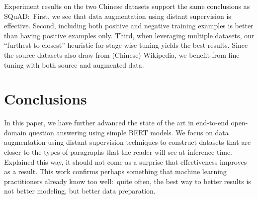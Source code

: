 \documentclass[11pt,a4paper]{article}
\begin{document}
Experiment results on the two Chinese datasets support the same conclusions as SQuAD:\
First, we see that data augmentation using distant supervision is effective.
Second, including both positive and negative training examples is better than having positive examples only.
Third, when leveraging multiple datasets, our ``furthest to closest'' heuristic for stage-wise tuning yields the best results.
Since the source datasets also draw from (Chinese) Wikipedia, we benefit from fine tuning with both source and augmented data.

\section{Conclusions}

In this paper, we have further advanced the state of the art in end-to-end open-domain question answering using simple BERT models.
We focus on data augmentation using distant supervision techniques to construct datasets that are closer to the types of paragraphs that the reader will see at inference time.
Explained this way, it should not come as a surprise that effectiveness improves as a result.
This work confirms perhaps something that machine learning practitioners already know too well:\ quite often, the best way to better results is not better modeling, but better data preparation.
\end{document}
